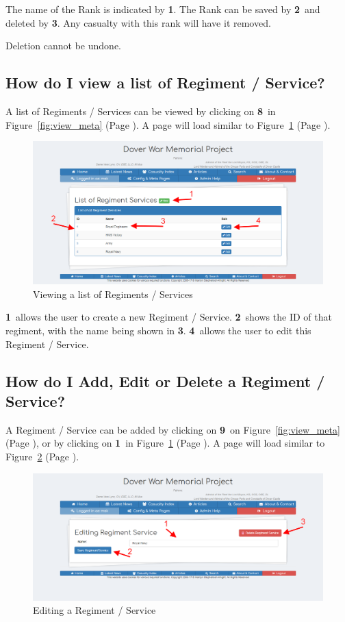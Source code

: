 \documentclass[12pt]{article}
\newcommand{\marker}[1]{\color{red}\textbf{#1}\color{black}}
\newcommand{\myref}[1]{\ref{#1} {\scriptsize(Page \pageref{#1})}}
\begin{document}
The name of the Rank is indicated by \marker{1}. The Rank can be saved by \marker{2}\ and deleted by \marker{3}. Any casualty with this rank will have it removed.

\begin{warningBox}
Deletion cannot be undone.
\end{warningBox} 

\newpage
\FloatBarrier
\subsection{How do I view a list of Regiment / Service?} \label{ssec:view_regiment}
A list of Regiments / Services can be viewed by clicking on \marker{8}\ in Figure~\myref{fig:view_meta}. A page will load similar to Figure~\myref{fig:view_regiment}.

\begin{figure}[h]
  \centering
 \includegraphics[width=.9\textwidth]{pics/view_regiment.png}
	\caption{Viewing a list of Regiments / Services}\label{fig:view_regiment}
\end{figure}

\marker{1}\ allows the user to create a new Regiment / Service. \marker{2}\ shows the ID of that regiment, with the name being shown in \marker{3}. \marker{4}\ allows the user to edit this Regiment / Service.

\newpage
\FloatBarrier
\subsection{How do I Add, Edit or Delete a Regiment / Service?} \label{ssec:edit_regiment}
A Regiment / Service can be added by clicking on \marker{9}\ on Figure~\myref{fig:view_meta}, or by clicking on \marker{1}\ in Figure~\myref{fig:view_regiment}. A page will load similar to Figure~\myref{fig:edit_regiment}.

\begin{figure}[h]
  \centering
 \includegraphics[width=.9\textwidth]{pics/edit_regiment.png}
	\caption{Editing a Regiment / Service}\label{fig:edit_regiment}
\end{figure}
\end{document}
